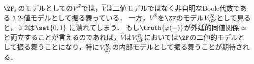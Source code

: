 \documentclass[realisability.tex]{subfiles}
\begin{document}
$\ZFe$のモデルとしての$V^{\mathcal{R}}$では，$\hat{V}$は二値モデルではなく非自明なBoole代数である$\gimel 2$-値モデルとして振る舞っている．
一方，$V^{\mathcal{R}}$を$\ZF$のモデル$V^{\mathcal{R}}_{\ZF}$として見ると，$\gimel 2$は$\set{0, 1}$ に潰れてしまう．
もし$\truth{\varphi(-)}$が外延的同値関係$\simeq$と両立することが言えるのであれば，$\hat{V}$は$V^{\mathcal{R}}_{\ZF}$においては$\ZF$の二値的モデルとして振る舞うことになり，特に$V^{\mathcal{R}}_{\ZF}$の内部モデルとして振る舞うことが期待される．
\nocite{Kamo:2007}
\end{document}
